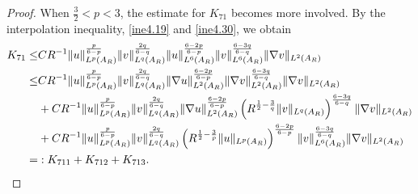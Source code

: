 \documentclass[11pt,reqno]{amsart}
\numberwithin{Thm}{section}
\begin{document}
\begin{proof}
When $\frac{3}{2}<p<3$, the estimate for $K_{71}$ becomes more involved. By the interpolation inequality, \eqref{ine4.19} and \eqref{ine4.30}, we obtain
\begin{align}\label{ine4.37}
	K_{71} \leq& C R^{-1} \|u\|_{L^p(A_R)}^{\frac{p}{6-p}}\|v\|_{L^q(A_R)}^{\frac{2q}{6-q}} \|u\|_{L^6(A_R)}^{\frac{6-2p}{6-p}}\|v\|_{L^6(A_R)}^{\frac{6-3q}{6-q}}  \|\nabla v\|_{L^2(A_R)}\notag\\
	\leq &C R^{-1} \|u\|_{L^p(A_R)}^{\frac{p}{6-p}}\|v\|_{L^q(A_R)}^{\frac{2q}{6-q}}\|\nabla u\|_{L^2(A_R)}^{\frac{6-2p}{6-p}}\|\nabla v\|_{L^2(A_R)}^{\frac{6-3q}{6-q}}\|\nabla v\|_{L^2(A_R)}\notag\\
&+C R^{-1} \|u\|_{L^p(A_R)}^{\frac{p}{6-p}}\|v\|_{L^q(A_R)}^{\frac{2q}{6-q}}\|\nabla u\|_{L^2(A_R)}^{\frac{6-2p}{6-p}}\left(R^{\frac{1}{2}-\frac{3}{q}} \|v\|_{L^q(A_R)}\right)^{\frac{6-3q}{6-q}}\|\nabla v\|_{L^2(A_R)}\\
&+C R^{-1} \|u\|_{L^p(A_R)}^{\frac{p}{6-p}}\|v\|_{L^q(A_R)}^{\frac{2q}{6-q}}\left(R^{\frac{1}{2}-\frac{3}{p}} \|u\|_{L^p(A_R)}\right)^{\frac{6-2p}{6-p}}
\|v\|_{L^6(A_R)}^{\frac{6-3q}{6-q}}\|\nabla v\|_{L^2(A_R)}\notag\\
=&:K_{711} + K_{712} + K_{713}.\notag
\end{align}



\end{proof}
\end{document}
